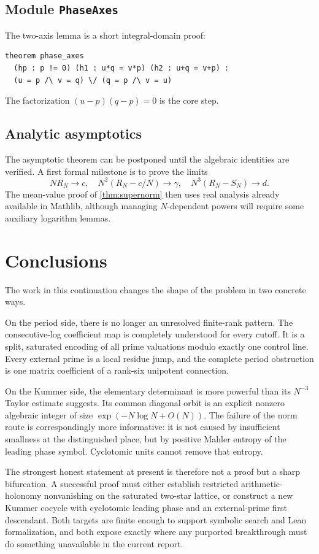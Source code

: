 \documentclass[11pt]{article}
\theoremstyle{definition}
\theoremstyle{remark}
\begin{document}
\subsection{Module \texttt{PhaseAxes}}

The two-axis lemma is a short integral-domain proof:
\begin{lstlisting}
theorem phase_axes
  (hp : p != 0) (h1 : u*q = v*p) (h2 : u+q = v+p) :
  (u = p /\ v = q) \/ (q = p /\ v = u)
\end{lstlisting}
The factorization $(u-p)(q-p)=0$ is the core step.

\subsection{Analytic asymptotics}

The asymptotic theorem can be postponed until the algebraic identities are
verified.  A first formal milestone is to prove the limits
\[
 NR_N\to c,\quad N^2(R_N-c/N)\to\gamma,
 \quad N^3(R_N-S_N)\to d.
\]
The mean-value proof of \cref{thm:supernorm} then uses real analysis already
available in Mathlib, although managing $N$-dependent powers will require some
auxiliary logarithm lemmas.

\section{Conclusions}

The work in this continuation changes the shape of the problem in two concrete
ways.

On the period side, there is no longer an unresolved finite-rank pattern.  The
consecutive-log coefficient map is completely understood for every cutoff.  It
is a split, saturated encoding of all prime valuations modulo exactly one
control line.  Every external prime is a local residue jump, and the complete
period obstruction is one matrix coefficient of a rank-six unipotent
connection.

On the Kummer side, the elementary determinant is more powerful than its
$N^{-3}$ Taylor estimate suggests.  Its common diagonal orbit is an explicit
nonzero algebraic integer of size $\exp(-N\log N+O(N))$.  The failure of the norm
route is correspondingly more informative: it is not caused by insufficient
smallness at the distinguished place, but by positive Mahler entropy of the
leading phase symbol.  Cyclotomic units cannot remove that entropy.

The strongest honest statement at present is therefore not a proof but a
sharp bifurcation.  A successful proof must either establish restricted
arithmetic-holonomy nonvanishing on the saturated two-star lattice, or construct
a new Kummer cocycle with cyclotomic leading phase and an external-prime first
descendant.  Both targets are finite enough to support symbolic search and Lean
formalization, and both expose exactly where any purported breakthrough must do
something unavailable in the current report.
\end{document}
